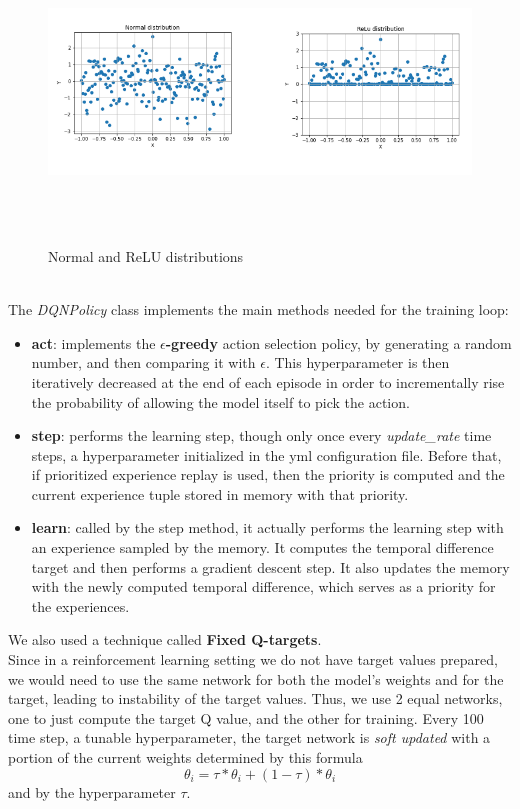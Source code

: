  \begin{figure}[H] 
\includegraphics[height=80mm, width=140mm, scale=0.5]{chapters/relu_dist.png}
\centering
\caption{Normal and ReLU distributions}
\label{fig:s3} 
\end{figure}

\noindent
\\
The \textit{DQNPolicy} class implements the main methods needed for the training loop:
\begin{itemize}
\item \textbf{act}: implements the \textbf{$\epsilon$-greedy} action selection policy, by generating a random number, and then comparing it with $\epsilon$. This hyperparameter is then iteratively decreased at the end of each episode in order to incrementally rise the probability of allowing the model itself to pick the action.
\item \textbf{step}: performs the learning step, though only once every \textit{update\_rate} time steps, a hyperparameter initialized in the yml configuration file. Before that, if prioritized experience replay is used, then the priority is computed and the current experience tuple stored in memory with that priority.
\item \textbf{learn}: called by the step method, it actually performs the learning step with an experience sampled by the memory. It computes the temporal difference target and then performs a gradient descent step. It also updates the memory with the newly computed temporal difference, which serves as a priority for the experiences.
\end{itemize}

\noindent
We also used a technique called \textbf{Fixed Q-targets}.\\
Since in a reinforcement learning setting we do not have target values prepared, we would need to use the same network for both the model's weights and for the target, leading to instability of the target values. Thus, we use 2 equal networks, one to just compute the target Q value, and the other for training. Every 100 time step, a tunable hyperparameter, the target network is \textit{soft updated} with a portion of the current weights determined by this formula $$\theta_i = \tau * \theta_i + (1 - \tau) * \theta_i$$ and by the hyperparameter $\tau$. 

